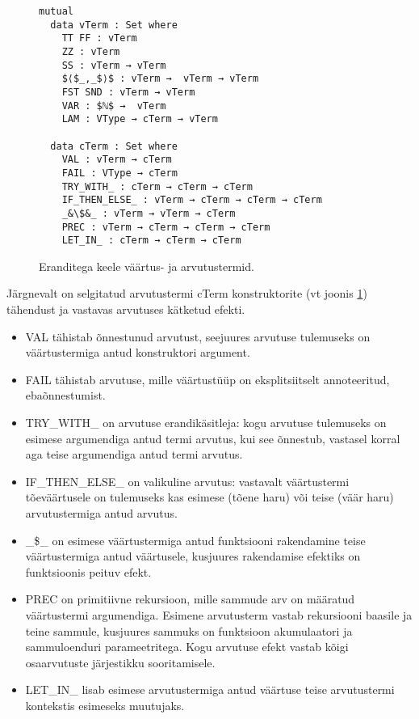 \documentclass[a4paper,12pt]{article}
\begin{document}
\begin{figure}
  \begin{lstlisting}
mutual
  data vTerm : Set where
    TT FF : vTerm
    ZZ : vTerm
    SS : vTerm → vTerm
    $⟨$_,_$⟩$ : vTerm →  vTerm → vTerm
    FST SND : vTerm → vTerm
    VAR : $ℕ$ →  vTerm
    LAM : VType → cTerm → vTerm

  data cTerm : Set where
    VAL : vTerm → cTerm
    FAIL : VType → cTerm
    TRY_WITH_ : cTerm → cTerm → cTerm
    IF_THEN_ELSE_ : vTerm → cTerm → cTerm → cTerm
    _&\$&_ : vTerm → vTerm → cTerm
    PREC : vTerm → cTerm → cTerm → cTerm
    LET_IN_ : cTerm → cTerm → cTerm

  \end{lstlisting}
  \caption{Eranditega keele väärtus- ja arvutustermid.}
  \label{fig:exc.raw}
\end{figure}

Järgnevalt on selgitatud arvutustermi cTerm konstruktorite (vt joonis \ref{fig:exc.raw}) tähendust ja vastavas arvutuses kätketud efekti.
\begin{itemize}
  \item VAL tähistab õnnestunud arvutust, seejuures arvutuse tulemuseks on väärtustermiga antud konstruktori argument.
  \item FAIL tähistab arvutuse, mille väärtustüüp on eksplitsiitselt annoteeritud, ebaõnnestumist.
  \item TRY_WITH_ on arvutuse erandikäsitleja: kogu arvutuse tulemuseks on esimese argumendiga antud termi arvutus, kui see õnnestub, vastasel korral aga teise argumendiga antud termi arvutus.
  \item IF_THEN_ELSE_ on valikuline arvutus: vastavalt väärtustermi tõeväärtusele on tulemuseks kas esimese (tõene haru) või teise (väär haru) arvutustermiga antud arvutus.
  \item _\$_ on esimese väärtustermiga antud funktsiooni rakendamine teise väärtustermiga antud väärtusele, kusjuures rakendamise efektiks on funktsioonis peituv efekt.
  \item PREC on primitiivne rekursioon, mille sammude arv on määratud väärtustermi argumendiga. Esimene arvutusterm vastab rekursiooni baasile ja teine sammule, kusjuures sammuks on funktsioon akumulaatori ja sammuloenduri parameetritega. Kogu arvutuse efekt vastab kõigi osaarvutuste järjestikku sooritamisele.
  \item LET_IN_ lisab esimese arvutustermiga antud väärtuse teise arvutustermi kontekstis esimeseks muutujaks.
\end{itemize}
\end{document}
